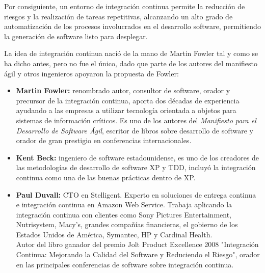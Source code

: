 Por consiguiente, un entorno de integración continua permite la reducción de riesgos y la realización de tareas repetitivas, alcanzando un alto grado de automatización de los procesos involucrados en el desarrollo software, permitiendo la generación de software listo para desplegar.

La idea de integración continua nació de la mano de Martin Fowler tal y como se ha dicho antes, pero no fue el único, dado que parte de los autores del manifiesto ágil y otros ingenieros apoyaron la propuesta de Fowler:

\clearpage


\begin{itemize}
\item \textbf{Martin Fowler:} renombrado autor, consultor de software, orador y precursor de la integración continua, aporta dos décadas de experiencia ayudando a las empresas a utilizar tecnología orientada a objetos para sistemas de información críticos. Es uno de los autores del \textit{Manifiesto para el Desarrollo de Software Ágil}, escritor de libros sobre desarrollo de software y orador de gran prestigio en conferencias internacionales.

\item \textbf{Kent Beck:} ingeniero de software estadounidense\cite{XP2}, es uno de los creadores de las metodologías de desarrollo de software \ac{XP} y \ac{TDD}, incluyó la integración continua como una de las buenas prácticas dentro de \ac{XP}.

\item \textbf{Paul Duvall:} CTO en Stelligent. Experto en soluciones de entrega continua e integración continua en Amazon Web Service. Trabaja aplicando la integración continua con clientes como Sony Pictures Entertainment, Nutrisystem, Macy's, grandes compañías financieras, el gobierno de los Estados Unidos de América, Symantec, HP y Cardinal Health.\\Autor del libro ganador del premio Jolt Product Excellence 2008 "Integración Continua: Mejorando la Calidad del Software y Reduciendo el Riesgo", orador en las principales conferencias de software sobre integración continua.

\end{itemize}

